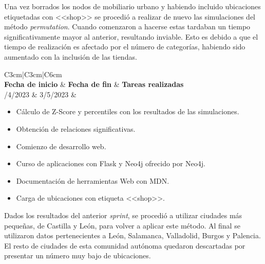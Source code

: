 Una vez borrados los nodos de mobiliario urbano y habiendo incluido ubicaciones etiquetadas con <<shop>> se procedió a realizar de nuevo las simulaciones del método \textit{permutation}. Cuando comenzaron a hacerse estas tardaban un tiempo significativamente mayor al anterior, resultando inviable. Esto es debido a que el tiempo de realización es afectado por el número de categorías, habiendo sido aumentado con la inclusión de las tiendas.


\begin{table}[h!]
	\centering
	\begin{tabular}{C{3cm}|C{3cm}|C{6cm}} 
		\\
		\midrule
		\textbf{Fecha de inicio} & \textbf{Fecha de fin} & \textbf{Tareas realizadas}\\
		/4/2023 & 3/5/2023 & \begin{itemize}[left=0pt]
			\item Cálculo de Z-Score y percentiles con los resultados de las simulaciones.
			\item Obtención de relaciones significativas.
			\item Comienzo de desarrollo web.
			\item Curso de aplicaciones con Flask y Neo4j ofrecido por Neo4j.
			\item Documentación de herramientas Web con MDN.
			\item Carga de ubicaciones con etiqueta <<shop>>.

		\end{itemize}\tabularnewline
		\bottomrule
	\end{tabular}
	\caption{Tabla del \textit{sprint} 6}
	\label{tabsprint6}
\end{table}

\newpage
Dados los resultados del anterior \textit{sprint}, se procedió a utilizar ciudades más pequeñas, de Castilla y León, para volver a aplicar este método. Al final se utilizaron datos pertenecientes a León, Salamanca, Valladolid, 
Burgos y Palencia. El resto de ciudades de esta comunidad autónoma quedaron descartadas por presentar un número muy bajo de ubicaciones.

